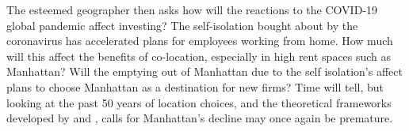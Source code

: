 The esteemed geographer then asks how will the reactions to the COVID-19 global pandemic affect investing?  The self-isolation bought about by the coronavirus has accelerated plans for employees working from home.  How much will this affect the benefits of co-location, especially in high rent spaces such as Manhattan?  Will the emptying out of Manhattan due to the self isolation's affect plans to choose Manhattan as a destination for new firms?   Time will tell, but looking at the past 50 years of location choices, and the theoretical frameworks developed by \cite{krugman1991increasing} and \cite{davis2002bones}, calls for Manhattan's decline may once again be premature.


